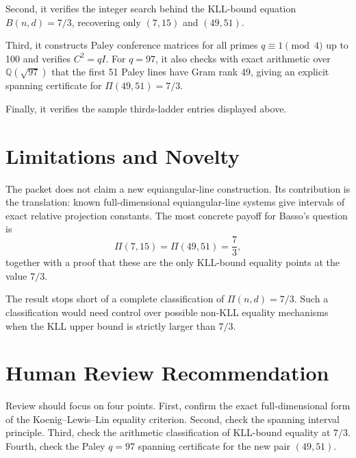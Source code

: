 \documentclass[11pt]{article}
\newcommand{\PiRel}{\Pi}
\newcommand{\Bnd}{B}
\begin{document}
Second, it verifies the integer search behind the KLL-bound equation
\(\Bnd(n,d)=7/3\), recovering only \((7,15)\) and \((49,51)\).

Third, it constructs Paley conference matrices for all primes
\(q\equiv1\pmod4\) up to 100 and verifies \(C^2=qI\).  For \(q=97\), it also
checks with exact arithmetic over \(\mathbb Q(\sqrt{97})\) that the first 51
Paley lines have Gram rank 49, giving an explicit spanning certificate for
\(\PiRel(49,51)=7/3\).

Finally, it verifies the sample thirds-ladder entries displayed above.

\section*{Limitations and Novelty}

The packet does not claim a new equiangular-line construction.  Its
contribution is the translation: known full-dimensional equiangular-line
systems give intervals of exact relative projection constants.  The most
concrete payoff for Basso's question is
\[
  \PiRel(7,15)=\PiRel(49,51)=\frac73,
\]
together with a proof that these are the only KLL-bound equality points at
the value \(7/3\).

The result stops short of a complete classification of \(\PiRel(n,d)=7/3\).
Such a classification would need control over possible non-KLL equality
mechanisms when the KLL upper bound is strictly larger than \(7/3\).

\section*{Human Review Recommendation}

Review should focus on four points.  First, confirm the exact full-dimensional
form of the Koenig--Lewis--Lin equality criterion.  Second, check the spanning
interval principle.  Third, check the arithmetic classification of KLL-bound
equality at \(7/3\).  Fourth, check the Paley \(q=97\) spanning certificate
for the new pair \((49,51)\).
\end{document}
